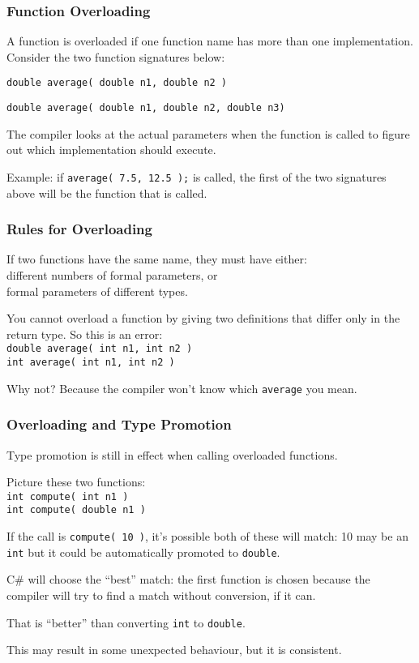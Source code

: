 \begin{frame}
\frametitle{Function Overloading}

A function is \alert{overloaded} if one function name has more than one implementation. Consider the two function signatures below:

\texttt{double average( double n1, double n2 )}

\texttt{double average( double n1, double n2, double n3) }

The compiler looks at the actual parameters when the function is called to figure out which implementation should execute.

Example: if \texttt{average( 7.5, 12.5 );} is called, the first of the two signatures above will be the function that is called.

\end{frame}

\begin{frame}
\frametitle{Rules for Overloading}

If two functions have the same name, they must have either:\\
\quad different numbers of formal parameters, or\\
\quad formal parameters of different types.

You cannot overload a function by giving two definitions that differ only in the return type. So this is an error:\\
\texttt{double average( int n1, int n2 )}\\
\texttt{int average( int n1, int n2 )}

Why not? Because the compiler won't know which \texttt{average} you mean.

\end{frame}

\begin{frame}
\frametitle{Overloading and Type Promotion}

Type promotion is still in effect when calling overloaded functions.

Picture these two functions:\\
\texttt{int compute( int n1 )}\\
\texttt{int compute( double n1 )}

If the call is \texttt{compute( 10 )}, it's possible both of these will match: 10 may be an \texttt{int} but it could be automatically promoted to \texttt{double}.

C\# will choose the ``best'' match: the first function is chosen because 
the compiler will try to find a match without conversion, if it can.

That is ``better'' than converting \texttt{int} to \texttt{double}.

This may result in some unexpected behaviour, but it is consistent.

\end{frame}

